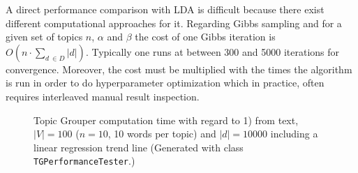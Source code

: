 \documentclass[10pt, a4paper, oneside]{article}
\begin{document}
A direct performance comparison with LDA is difficult because there exist different computational approaches for it. Regarding Gibbs sampling and for a given set of topics $n$, $\alpha$ and $\beta$ the cost of one Gibbs iteration is $O(n \cdot \sum_{d\ \in D} |d|)$. Typically one runs at between 300 and 5000 iterations for convergence. Moreover, the cost must be multiplied with the times the algorithm is run in order to do hyperparameter optimization which in practice, often requires interleaved manual result inspection.

\begin{figure}
\caption{Topic Grouper computation time with regard to 1) from text, $|V| = 100$ ($n = 10$, 10 words per topic) and $|d| = 10000$ including a linear regression trend line (Generated with class \texttt{TGPerformanceTester}.)}
\label{perf1}
\end{figure}
\end{document}
